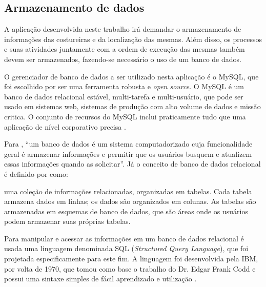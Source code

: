 \subsection{Armazenamento de dados}

\par A aplicação desenvolvida neste trabalho irá demandar o armazenamento de
informações das costureiras e da localização das mesmas. Além disso, os
processos e suas atividades juntamente com a ordem de execução das mesmas
também devem ser armazenados, fazendo-se necessário o uso de um banco de dados.

\par O gerenciador de banco de dados a ser utilizado nesta aplicação é o MySQL,
que foi escolhido por ser uma ferramenta robusta e \textit{open source}. O
MySQL é um banco de dados relacional estável, multi-tarefa e multi-usuário, que
pode ser usado em sistemas web, sistemas de produção com alto volume de dados e
missão critica. O conjunto de recursos do MySQL inclui praticamente tudo
que uma aplicação de nível corporativo precisa \cite{livro_mysql_bible}.

\par Para  , ``um banco de dados é um
sistema computadorizado cuja funcionalidade geral é armazenar informações e
permitir que os usuários busquem e atualizem essas informações quando as
solicitar''. Já o conceito de banco de dados relacional é definido por
 como:
\begin{citacao}
uma coleção de informações relacionadas, organizadas em tabelas. Cada tabela
armazena dados em linhas; os dados são organizados em colunas. As tabelas são
armazenadas em esquemas de banco de dados, que são áreas  onde os usuários 
podem armazenar suas próprias tabelas.
\end{citacao}
 \par Para manipular e acessar as informações em um banco de dados relacional
 é usada uma linguagem denominada SQL (\textit{Structured Query Language}), que
 foi projetada  especificamente para este fim. A linguagem foi desenvolvida
 pela IBM, por volta de 1970, que tomou como base o trabalho do Dr. Edgar Frank
 Codd e possui uma sintaxe simples de fácil aprendizado e utilização \cite{oracle_database_sql}.



